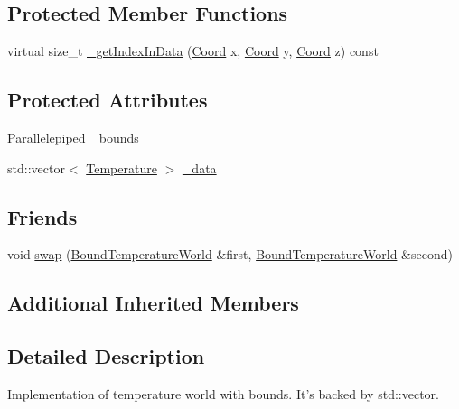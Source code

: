 \subsection*{Protected Member Functions}
\begin{DoxyCompactItemize}
\item 
virtual size\-\_\-t \hyperlink{class_bound_temperature_world_a6be6a48b1a29f0b1cc4a01b5e0369f9e}{\-\_\-get\-Index\-In\-Data} (\hyperlink{struct_coord}{Coord} x, \hyperlink{struct_coord}{Coord} y, \hyperlink{struct_coord}{Coord} z) const 
\end{DoxyCompactItemize}
\subsection*{Protected Attributes}
\begin{DoxyCompactItemize}
\item 
\hyperlink{struct_parallelepiped}{Parallelepiped} \hyperlink{class_bound_temperature_world_a4e460fde774b68cb821e6b263e71448b}{\-\_\-bounds}
\item 
std\-::vector$<$ \hyperlink{struct_temperature}{Temperature} $>$ \hyperlink{class_bound_temperature_world_a7c0722e68bbe02de068ccb6244522c7a}{\-\_\-data}
\end{DoxyCompactItemize}
\subsection*{Friends}
\begin{DoxyCompactItemize}
\item 
void \hyperlink{class_bound_temperature_world_a684a1f2310369a9bcf86e6c8e4384e51}{swap} (\hyperlink{class_bound_temperature_world}{Bound\-Temperature\-World} \&first, \hyperlink{class_bound_temperature_world}{Bound\-Temperature\-World} \&second)
\end{DoxyCompactItemize}
\subsection*{Additional Inherited Members}


\subsection{Detailed Description}
Implementation of temperature world with bounds. It's backed by {\ttfamily std\-::vector}. 


